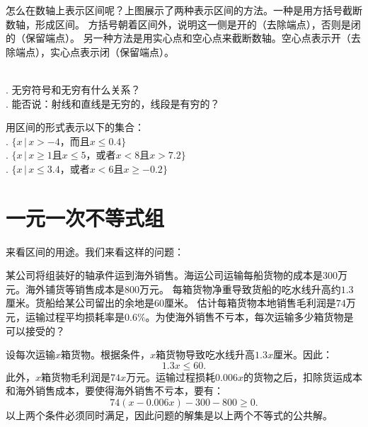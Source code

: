 \documentclass[12pt,UTF8]{ctexbook}
\begin{document}
怎么在数轴上表示区间呢？上图展示了两种表示区间的方法。一种是用方括号截断数轴，形成区间。
方括号朝着区间外，说明这一侧是开的（去除端点），否则是闭的（保留端点）。
另一种方法是用实心点和空心点来截断数轴。空心点表示开（去除端点），实心点表示闭（保留端点）。

\begin{sk}\label{sk:5-4-0}
    \mbox{}\\
    . 无穷符号和无穷有什么关系？\\
    . 能否说：射线和直线是无穷的，线段是有穷的？
\end{sk}
\begin{xt}\label{xt:5-4-0}
    用区间的形式表示以下的集合：\\
    . $\{x \, | \, x > -4 \mbox{，而且} x \leqslant 0.4 \}$ \\
    . $\{x \, | \, x \geqslant 1 \mbox{且} x \leqslant 5 \mbox{，或者} x < 8  \mbox{且} x > 7.2 \}$ \\
    . $\{x \, | \, x \leqslant 3.4 \mbox{，或者} x < 6  \mbox{且} x \geqslant -0.2 \}$
\end{xt}

\section{一元一次不等式组}
来看区间的用途。我们来看这样的问题：
\begin{ex}\label{ex:5-5-0}
    某公司将组装好的轴承件运到海外销售。海运公司运输每船货物的成本是$300$万元。海外铺货等销售成本是$800$万元。
    每箱货物净重导致货船的吃水线升高约$1.3$厘米。货船给某公司留出的余地是$60$厘米。
    估计每箱货物本地销售毛利润是$74$万元，运输过程平均损耗率是$0.6\%$。为使海外销售不亏本，每次运输多少箱货物是可以接受的？
\end{ex}

\begin{so}
    设每次运输$x$箱货物。根据条件，$x$箱货物导致吃水线升高$1.3x$厘米。因此：
    $$ 1.3x \leqslant  60.$$
    此外，$x$箱货物毛利润是$74x$万元。运输过程损耗$0.006x$的货物之后，扣除货运成本和海外销售成本，要使得海外销售不亏本，要有：
    $$ 74 (x - 0.006x) - 300 - 800 \geqslant 0. $$
    以上两个条件必须同时满足，因此问题的解集是以上两个不等式的公共解。
\end{so}
\end{document}
